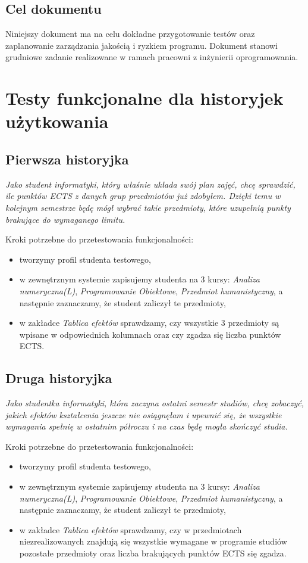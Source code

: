 \documentclass{article}
\begin{document}
\subsection{Cel dokumentu}
Niniejszy dokument ma na celu dokładne przygotowanie testów oraz zaplanowanie zarządzania jakością i ryzkiem programu.
Dokument stanowi grudniowe zadanie realizowane w ramach pracowni z inżynierii oprogramowania.


\section{Testy funkcjonalne dla historyjek użytkowania}
\subsection{Pierwsza historyjka}
\textit{Jako student informatyki, który właśnie układa swój plan zajęć, chcę sprawdzić, ile punktów ECTS z danych grup przedmiotów już zdobyłem.
Dzięki temu w kolejnym semestrze będę mógł wybrać takie przedmioty, które uzupełnią punkty brakujące do wymaganego limitu.}

\medskip
\noindent Kroki potrzebne do przetestowania funkcjonalności:
\begin{itemize}
 \item tworzymy profil studenta testowego,
 \item w zewnętrznym systemie zapisujemy studenta na 3 kursy: \textit{Analiza numeryczna(L)}, \textit{Programowanie Obiektowe}, \textit{Przedmiot humanistyczny}, a następnie zaznaczamy, że student zaliczył te przedmioty,
 \item w zakładce \textit{Tablica efektów} sprawdzamy, czy wszystkie 3 przedmioty są wpisane w odpowiednich kolumnach oraz czy zgadza się liczba punktów ECTS.
\end{itemize}


\subsection{Druga historyjka}
\textit{Jako studentka informatyki, która zaczyna ostatni semestr studiów, chcę zobaczyć, jakich efektów kształcenia jeszcze nie osiągnęłam i upewnić się, że wszystkie wymagania spełnię w ostatnim półroczu i na czas będę mogła skończyć studia.}

\medskip
\noindent Kroki potrzebne do przetestowania funkcjonalności:
\begin{itemize}
 \item tworzymy profil studenta testowego,
 \item w zewnętrznym systemie zapisujemy studenta na 3 kursy: \textit{Analiza numeryczna(L)}, \textit{Programowanie Obiektowe}, \textit{Przedmiot humanistyczny}, a następnie zaznaczamy, że student zaliczył te przedmioty,
 \item w zakładce \textit{Tablica efektów} sprawdzamy, czy w przedmiotach niezrealizowanych znajdują się wszystkie wymagane w programie studiów pozostałe przedmioty oraz
 liczba brakujących punktów ECTS się zgadza.
\end{itemize}
\end{document}
